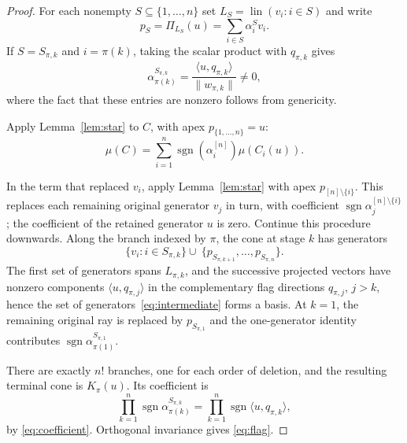 \documentclass[10pt,a4paper]{amsart}
\DeclareMathOperator{\sgn}{sgn}
\newcommand{\ip}[2]{\langle #1,#2\rangle}
\newcommand{\lin}{\operatorname{lin}}
\newcommand{\norm}[1]{\lVert #1\rVert}
\begin{document}
\begin{proof}
For each nonempty $S\subseteq\{1,\ldots,n\}$ set $L_S=\lin(v_i\colon i\in S)$ and write
\[
 p_S=\Pi_{L_S}(u)=\sum_{i\in S}\alpha_i^S v_i.
\]
If $S=S_{\pi,k}$ and $i=\pi(k)$, taking the scalar product with
$q_{\pi,k}$ gives
\begin{equation}\label{eq:coefficient}
 \alpha_{\pi(k)}^{S_{\pi,k}}
   =\frac{\ip{u}{q_{\pi,k}}}{\norm{w_{\pi,k}}}\neq 0,
\end{equation}
where the fact that these entries are nonzero follows from genericity.

Apply Lemma~\ref{lem:star} to $C$, with apex
$p_{\{1,\ldots,n\}}=u$:
\begin{equation*}
  \mu(C)=\sum_{i=1}^n\sgn(\alpha_i^{[n]})\mu(C_i(u)).
\end{equation*}

In the term that replaced $v_i$, apply Lemma~\ref{lem:star} with apex
$p_{[n]\setminus\{i\}}$. This replaces each remaining original generator
$v_j$ in turn, with coefficient $\sgn\alpha_j^{[n]\setminus\{i\}}$;
the coefficient of the retained generator $u$ is zero.
Continue this procedure downwards. Along the branch
indexed by $\pi$, the cone at stage $k$ has generators
\begin{equation}\label{eq:intermediate}
 \{v_i\colon i\in S_{\pi,k}\} \cup\
 \{p_{S_{\pi,k+1}},\ldots,p_{S_{\pi,n}}\}.
\end{equation}
The first set of generators spans $L_{\pi,k}$, and the
successive projected vectors have nonzero components $\langle u,q_{\pi,j}\rangle$
in the complementary flag directions $q_{\pi,j}$, $j>k$, hence the set of generators~\eqref{eq:intermediate}
forms a basis. At $k=1$, the remaining original ray is replaced by
$p_{S_{\pi,1}}$ and the one-generator identity contributes
$\sgn\alpha_{\pi(1)}^{S_{\pi,1}}$.

There are exactly $n!$ branches, one for each order of deletion, and
the resulting terminal cone is $K_\pi(u)$. Its coefficient is
\[
 \prod_{k=1}^n\sgn\alpha_{\pi(k)}^{S_{\pi,k}}
 =\prod_{k=1}^n\sgn\ip{u}{q_{\pi,k}},
\]
by \eqref{eq:coefficient}.
Orthogonal invariance gives \eqref{eq:flag}.
\end{proof}
\end{document}
